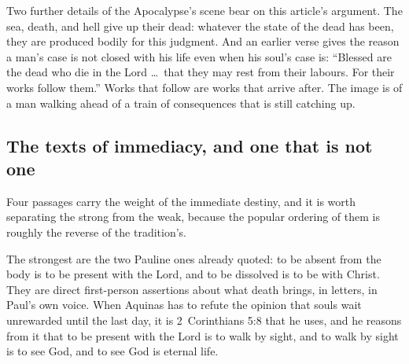 Two further details of the Apocalypse's scene bear on this article's argument. The sea, death, and hell give up their dead: whatever the state of the dead has been, they are produced bodily for this judgment. And an earlier verse gives the reason a man's case is not closed with his life even when his soul's case is: ``Blessed are the dead who die in the Lord \ldots\ that they may rest from their labours. For their works follow them.'' Works that follow are works that arrive after. The image is of a man walking ahead of a train of consequences that is still catching up.

\subsection{The texts of immediacy, and one that is not one}

Four passages carry the weight of the immediate destiny, and it is worth separating the strong from the weak, because the popular ordering of them is roughly the reverse of the tradition's.

The strongest are the two Pauline ones already quoted: to be absent from the body is to be present with the Lord, and to be dissolved is to be with Christ. They are direct first-person assertions about what death brings, in letters, in Paul's own voice. When Aquinas has to refute the opinion that souls wait unrewarded until the last day, it is 2~Corinthians 5:8 that he uses, and he reasons from it that to be present with the Lord is to walk by sight, and to walk by sight is to see God, and to see God is eternal life.

